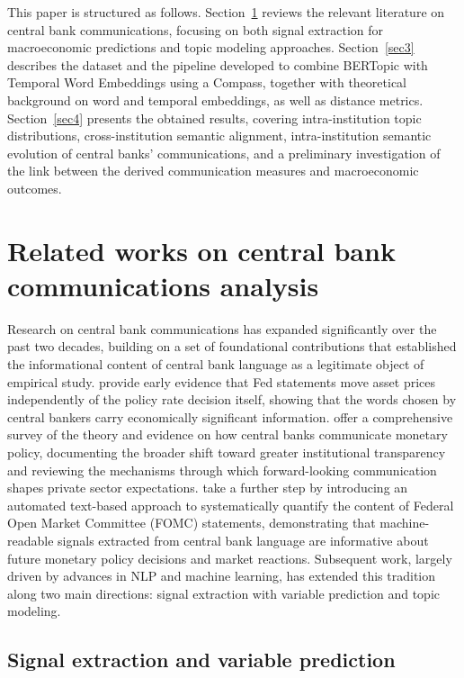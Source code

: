 This paper is structured as follows. Section~\ref{sec2} reviews the relevant literature on central bank communications, focusing on both signal extraction for macroeconomic predictions and topic modeling approaches. Section~\ref{sec3} describes the dataset and the pipeline developed to combine BERTopic with Temporal Word Embeddings using a Compass, together with theoretical background on word and temporal embeddings, as well as distance metrics. Section~\ref{sec4} presents the obtained results, covering intra-institution topic distributions, cross-institution semantic alignment, intra-institution semantic evolution of central banks' communications, and a preliminary investigation of the link between the derived communication measures and macroeconomic outcomes.

\section{Related works on central bank communications analysis}\label{sec2}
Research on central bank communications has expanded significantly over the past two decades, building on a set of foundational contributions that established the informational content of central bank language as a legitimate object of empirical study. \cite{gurkaynak_actions_2004} provide early evidence that Fed statements move asset prices independently of the policy rate decision itself, showing that the words chosen by central bankers carry economically significant information. \cite{blinder_central_2008} offer a comprehensive survey of the theory and evidence on how central banks communicate monetary policy, documenting the broader shift toward greater institutional transparency and reviewing the mechanisms through which forward-looking communication shapes private sector expectations. \cite{lucca_measuring_2009} take a further step by introducing an automated text-based approach to systematically quantify the content of Federal Open Market Committee (FOMC) statements, demonstrating that machine-readable signals extracted from central bank language are informative about future monetary policy decisions and market reactions. Subsequent work, largely driven by advances in NLP and machine learning, has extended this tradition along two main directions: signal extraction with variable prediction and topic modeling.

\subsection{Signal extraction and variable prediction}


